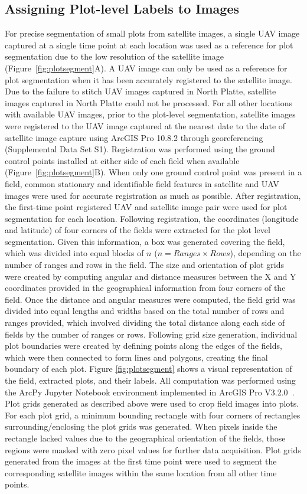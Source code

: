 \documentclass[12pt,twoside]{gsag3jnl}
\begin{document}
\subsection{Assigning Plot-level Labels to Images} 
For precise segmentation of small plots from satellite images, a single UAV image captured at a single time point at each location was used as a reference for plot segmentation due to the low resolution of the satellite image (Figure~\ref{fig:plotsegment}A). A UAV image can only be used as a reference for plot segmentation when it has been accurately registered to the satellite image. Due to the failure to stitch UAV images captured in North Platte, satellite images captured in North Platte could not be processed. For all other locations with available UAV images, prior to the plot-level segmentation, satellite images were registered to the UAV image captured at the nearest date to the date of satellite image capture using ArcGIS Pro 10.8.2 through georeferencing (Supplemental Data Set S1). Registration was performed using the ground control points installed at either side of each field when available (Figure~\ref{fig:plotsegment}B). When only one ground control point was present in a field, common stationary and identifiable field features in satellite and UAV images were used for accurate registration as much as possible. After registration, the first-time point registered UAV and satellite image pair were used for plot segmentation for each location. Following registration, the coordinates (longitude and latitude) of four corners of the fields were extracted for the plot level segmentation. Given this information, a box was generated covering the field, which was divided into equal blocks of $n$ ($n = Ranges \times Rows$), depending on the number of ranges and rows in the field.
The size and orientation of plot grids were created by computing angular and distance measures between the X and Y coordinates provided in the geographical information from four corners of the field. Once the distance and angular measures were computed, the field grid was divided into equal lengths and widths based on the total number of rows and ranges provided, which involved dividing the total distance along each side of fields by the number of ranges or rows. Following grid size generation, individual plot boundaries were created by defining points along the edges of the fields, which were then connected to form lines and polygons, creating the final boundary of each plot. Figure \ref{fig:plotsegment} shows a visual representation of the field, extracted plots, and their labels. All computation was performed using the ArcPy Jupyter Notebook environment implemented in ArcGIS Pro V3.2.0~\citep{Carroll24IDC}. Plot grids generated as described above were used to crop field images into plots. For each plot grid, a minimum bounding rectangle with four corners of rectangles surrounding/enclosing the plot grids was generated. When pixels inside the rectangle lacked values due to the geographical orientation of the fields, those regions were masked with zero pixel values for further data acquisition.  Plot grids generated from the images at the first time point were used to segment the corresponding satellite images within the same location from all other time points.
\end{document}
